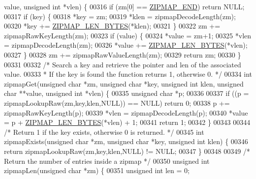 \begin{DoxyCode}
{{      value, \textcolor{keywordtype}{unsigned} \textcolor{keywordtype}{int} *vlen) \{
00316     \textcolor{keywordflow}{if} (zm[0] == \hyperlink{zipmap_8c_a7074100d2ecc0c8971936a4edc208782}{ZIPMAP\_END}) \textcolor{keywordflow}{return} NULL;
00317     \textcolor{keywordflow}{if} (key) \{
00318         *key = zm;
00319         *klen = zipmapDecodeLength(zm);
00320         *key += \hyperlink{zipmap_8c_a3e2d7a4d7208d88fc1b254a2da9bec13}{ZIPMAP\_LEN\_BYTES}(*klen);
00321     \}
00322     zm += zipmapRawKeyLength(zm);
00323     \textcolor{keywordflow}{if} (value) \{
00324         *value = zm+1;
00325         *vlen = zipmapDecodeLength(zm);
00326         *value += \hyperlink{zipmap_8c_a3e2d7a4d7208d88fc1b254a2da9bec13}{ZIPMAP\_LEN\_BYTES}(*vlen);
00327     \}
00328     zm += zipmapRawValueLength(zm);
00329     \textcolor{keywordflow}{return} zm;
00330 \}
00331 
00332 \textcolor{comment}{/* Search a key and retrieve the pointer and len of the associated value.}
00333 \textcolor{comment}{ * If the key is found the function returns 1, otherwise 0. */}
00334 \textcolor{keywordtype}{int} zipmapGet(\textcolor{keywordtype}{unsigned} \textcolor{keywordtype}{char} *zm, \textcolor{keywordtype}{unsigned} \textcolor{keywordtype}{char} *key, \textcolor{keywordtype}{unsigned} \textcolor{keywordtype}{int} klen, \textcolor{keywordtype}{unsigned} \textcolor{keywordtype}{char} **value, \textcolor{keywordtype}{
      unsigned} \textcolor{keywordtype}{int} *vlen) \{
00335     \textcolor{keywordtype}{unsigned} \textcolor{keywordtype}{char} *p;
00336 
00337     \textcolor{keywordflow}{if} ((p = zipmapLookupRaw(zm,key,klen,NULL)) == NULL) \textcolor{keywordflow}{return} 0;
00338     p += zipmapRawKeyLength(p);
00339     *vlen = zipmapDecodeLength(p);
00340     *value = p + \hyperlink{zipmap_8c_a3e2d7a4d7208d88fc1b254a2da9bec13}{ZIPMAP\_LEN\_BYTES}(*vlen) + 1;
00341     \textcolor{keywordflow}{return} 1;
00342 \}
00343 
00344 \textcolor{comment}{/* Return 1 if the key exists, otherwise 0 is returned. */}
00345 \textcolor{keywordtype}{int} zipmapExists(\textcolor{keywordtype}{unsigned} \textcolor{keywordtype}{char} *zm, \textcolor{keywordtype}{unsigned} \textcolor{keywordtype}{char} *key, \textcolor{keywordtype}{unsigned} \textcolor{keywordtype}{int} klen) \{
00346     \textcolor{keywordflow}{return} zipmapLookupRaw(zm,key,klen,NULL) != NULL;
00347 \}
00348 
00349 \textcolor{comment}{/* Return the number of entries inside a zipmap */}
00350 \textcolor{keywordtype}{unsigned} \textcolor{keywordtype}{int} zipmapLen(\textcolor{keywordtype}{unsigned} \textcolor{keywordtype}{char} *zm) \{
00351     \textcolor{keywordtype}{unsigned} \textcolor{keywordtype}{int} len = 0;
}}
\end{DoxyCode}
